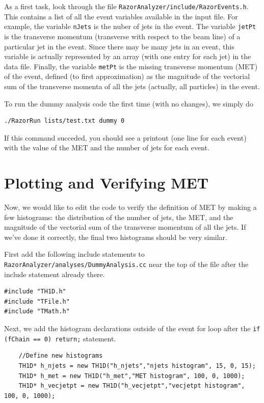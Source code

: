 \documentclass{article}
\begin{document}
As a first task, look through the file
\texttt{RazorAnalyzer/include/RazorEvents.h}. This contains a list of
all the event variables available in the input file. For example,  the variable \texttt{nJets} is the nuber of jets in the
event. The variable \texttt{jetPt} is the transverse momentum (transverse with
respect to the beam line) of a particular jet
in the event. Since there may be many jets in an event, this variable is
actually represented by an array (with one entry for each jet) in the
data file.  Finally, the variable \texttt{metPt} is the missing
transverse momentum (MET) of the event, defined (to first
approximation) as the magnitude of the vectorial sum of the transverse
momenta of all the jets (actually, all particles) in the event.

To run the dummy analysis code the first time (with no changes), we simply do
\begin{verbatim}
./RazorRun lists/test.txt dummy 0
\end{verbatim}
If this command succeded, you should see a printout (one line for each
event) with the value of the MET and the number of jets for each event.


\section{Plotting and Verifying MET}
Now, we would like to edit the code to verify the definition of MET by
making a few histograms: the distribution of the number of
jets, the MET, and the magnitude of the vectorial sum of the transverse
momentum of all the jets. If we've done it correctly, the final two
histograms should be very similar.

First add the following include statements to
\texttt{RazorAnalyzer/analyses/DummyAnalysis.cc} near the top of the
file after the include statement already there.
\begin{verbatim}
#include "TH1D.h"
#include "TFile.h"
#include "TMath.h"
\end{verbatim}

Next, we add the histogram declarations outside of the event for loop after the \texttt{if (fChain
  == 0) return;} statement.
\begin{verbatim}
    //Define new histograms
    TH1D* h_njets = new TH1D("h_njets","njets histogram", 15, 0, 15);
    TH1D* h_met = new TH1D("h_met","MET histogram", 100, 0, 1000);
    TH1D* h_vecjetpt = new TH1D("h_vecjetpt","vecjetpt histogram", 100, 0, 1000);
\end{verbatim}
\end{document}
